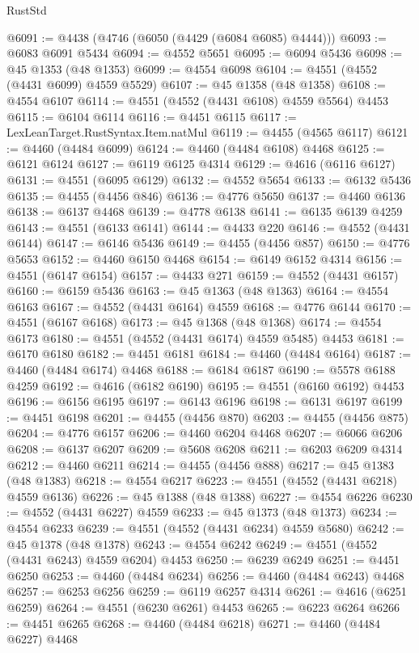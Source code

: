 \begin{lexlean}{RustStd}
\begin{coremodule}
@6091 := @4438 (@4746 (@6050 (@4429 (@6084 @6085) @4444)))
@6093 := @6083 @6091 @5434
@6094 := @4552 @5651
@6095 := @6094 @5436
@6098 := @45 @1353 (@48 @1353)
@6099 := @4554 @6098
@6104 := @4551 (@4552 (@4431 @6099) @4559 @5529)
@6107 := @45 @1358 (@48 @1358)
@6108 := @4554 @6107
@6114 := @4551 (@4552 (@4431 @6108) @4559 @5564) @4453
@6115 := @6104 @6114
@6116 := @4451 @6115
@6117 := LexLeanTarget.RustSyntax.Item.natMul
@6119 := @4455 (@4565 @6117)
@6121 := @4460 (@4484 @6099)
@6124 := @4460 (@4484 @6108) @4468
@6125 := @6121 @6124
@6127 := @6119 @6125 @4314
@6129 := @4616 (@6116 @6127)
@6131 := @4551 (@6095 @6129)
@6132 := @4552 @5654
@6133 := @6132 @5436
@6135 := @4455 (@4456 @846)
@6136 := @4776 @5650
@6137 := @4460 @6136
@6138 := @6137 @4468
@6139 := @4778 @6138
@6141 := @6135 @6139 @4259
@6143 := @4551 (@6133 @6141)
@6144 := @4433 @220
@6146 := @4552 (@4431 @6144)
@6147 := @6146 @5436
@6149 := @4455 (@4456 @857)
@6150 := @4776 @5653
@6152 := @4460 @6150 @4468
@6154 := @6149 @6152 @4314
@6156 := @4551 (@6147 @6154)
@6157 := @4433 @271
@6159 := @4552 (@4431 @6157)
@6160 := @6159 @5436
@6163 := @45 @1363 (@48 @1363)
@6164 := @4554 @6163
@6167 := @4552 (@4431 @6164) @4559
@6168 := @4776 @6144
@6170 := @4551 (@6167 @6168)
@6173 := @45 @1368 (@48 @1368)
@6174 := @4554 @6173
@6180 := @4551 (@4552 (@4431 @6174) @4559 @5485) @4453
@6181 := @6170 @6180
@6182 := @4451 @6181
@6184 := @4460 (@4484 @6164)
@6187 := @4460 (@4484 @6174) @4468
@6188 := @6184 @6187
@6190 := @5578 @6188 @4259
@6192 := @4616 (@6182 @6190)
@6195 := @4551 (@6160 @6192) @4453
@6196 := @6156 @6195
@6197 := @6143 @6196
@6198 := @6131 @6197
@6199 := @4451 @6198
@6201 := @4455 (@4456 @870)
@6203 := @4455 (@4456 @875)
@6204 := @4776 @6157
@6206 := @4460 @6204 @4468
@6207 := @6066 @6206
@6208 := @6137 @6207
@6209 := @5608 @6208
@6211 := @6203 @6209 @4314
@6212 := @4460 @6211
@6214 := @4455 (@4456 @888)
@6217 := @45 @1383 (@48 @1383)
@6218 := @4554 @6217
@6223 := @4551 (@4552 (@4431 @6218) @4559 @6136)
@6226 := @45 @1388 (@48 @1388)
@6227 := @4554 @6226
@6230 := @4552 (@4431 @6227) @4559
@6233 := @45 @1373 (@48 @1373)
@6234 := @4554 @6233
@6239 := @4551 (@4552 (@4431 @6234) @4559 @5680)
@6242 := @45 @1378 (@48 @1378)
@6243 := @4554 @6242
@6249 := @4551 (@4552 (@4431 @6243) @4559 @6204) @4453
@6250 := @6239 @6249
@6251 := @4451 @6250
@6253 := @4460 (@4484 @6234)
@6256 := @4460 (@4484 @6243) @4468
@6257 := @6253 @6256
@6259 := @6119 @6257 @4314
@6261 := @4616 (@6251 @6259)
@6264 := @4551 (@6230 @6261) @4453
@6265 := @6223 @6264
@6266 := @4451 @6265
@6268 := @4460 (@4484 @6218)
@6271 := @4460 (@4484 @6227) @4468

\end{coremodule}
\end{lexlean}
